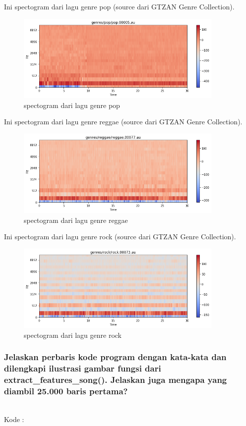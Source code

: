 Ini spectogram dari lagu genre pop (source dari GTZAN Genre Collection).

\begin{figure}[H]
	\centering
	\includegraphics[width=10cm]{figures/1174083/figures6/19.png}
	\caption{spectogram dari lagu genre pop}
\end{figure}

Ini spectogram dari lagu genre reggae (source dari GTZAN Genre Collection).

\begin{figure}[H]
	\centering
	\includegraphics[width=10cm]{figures/1174083/figures6/20.png}
	\caption{spectogram dari lagu genre reggae}
\end{figure}

Ini spectogram dari lagu genre rock (source dari GTZAN Genre Collection).

\begin{figure}[H]
	\centering
	\includegraphics[width=10cm]{figures/1174083/figures6/21.png}
	\caption{spectogram dari lagu genre rock}
\end{figure}


\subsubsection{Jelaskan perbaris kode program dengan kata-kata dan dilengkapi ilustrasi gambar fungsi dari extract\_features\_song(). Jelaskan juga mengapa yang diambil 25.000 baris pertama?}
\hfill\\
Kode :


